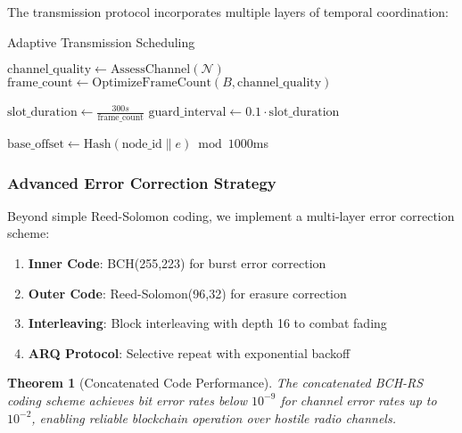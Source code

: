 \documentclass[11pt,a4paper]{article}
\newtheorem{theorem}{Theorem}[section]
\begin{document}
The transmission protocol incorporates multiple layers of temporal coordination:

\begin{algorithm}[H]
\SetAlgoLined
{}
\caption{Adaptive Transmission Scheduling}

$\text{channel\_quality} \leftarrow \text{AssessChannel}(\mathcal{N})$\;
$\text{frame\_count} \leftarrow \text{OptimizeFrameCount}(B, \text{channel\_quality})$\;

$\text{slot\_duration} \leftarrow \frac{300s}{\text{frame\_count}}$\;
$\text{guard\_interval} \leftarrow 0.1 \cdot \text{slot\_duration}$\;

$\text{base\_offset} \leftarrow \text{Hash}(\text{node\_id} \| e) \bmod 1000$ms\;


\;
\end{algorithm}

\subsubsection{Advanced Error Correction Strategy}

Beyond simple Reed-Solomon coding, we implement a multi-layer error correction scheme:

\begin{enumerate}
\item \textbf{Inner Code}: BCH(255,223) for burst error correction
\item \textbf{Outer Code}: Reed-Solomon(96,32) for erasure correction  
\item \textbf{Interleaving}: Block interleaving with depth 16 to combat fading
\item \textbf{ARQ Protocol}: Selective repeat with exponential backoff
\end{enumerate}

\begin{theorem}[Concatenated Code Performance]
The concatenated BCH-RS coding scheme achieves bit error rates below $10^{-9}$ for channel error rates up to $10^{-2}$, enabling reliable blockchain operation over hostile radio channels.
\end{theorem}
\end{document}
